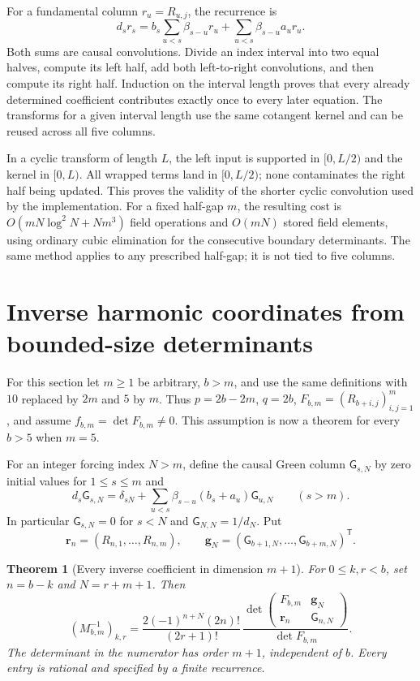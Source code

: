 \documentclass[11pt,a4paper]{article}
\newtheorem{theorem}{Theorem}[section]
\theoremstyle{definition}
\theoremstyle{remark}
\numberwithin{equation}{section}
\begin{document}
For a fundamental column $r_u=R_{u,j}$, the recurrence is
\[
 d_sr_s=b_s\sum_{u<s}\beta_{s-u}r_u
                  +\sum_{u<s}\beta_{s-u}a_ur_u.
\]
Both sums are causal convolutions. Divide an index interval into
two equal halves, compute its left half, add both left-to-right
convolutions, and then compute its right half. Induction on the
interval length proves that every already determined coefficient
contributes exactly once to every later equation. The transforms
for a given interval length use the same cotangent kernel and can
be reused across all five columns.

In a cyclic transform of length $L$, the left input is supported
in $[0,L/2)$ and the kernel in $[0,L)$. All wrapped terms land in
$[0,L/2)$; none contaminates the right half being updated.
This proves the validity of the shorter cyclic convolution used
by the implementation. For a fixed half-gap $m$, the resulting
cost is $O(mN\log^2N+Nm^3)$ field operations and $O(mN)$ stored
field elements, using ordinary cubic elimination for the consecutive
boundary determinants. The same method applies to any prescribed
half-gap; it is not tied to five columns.

\section{Inverse harmonic coordinates from bounded-size determinants}
\label{gt:green-section}

For this section let $m\ge1$ be arbitrary, $b>m$, and use the same
definitions with $10$ replaced by $2m$ and $5$ by $m$.
Thus $p=2b-2m$, $q=2b$, $F_{b,m}=(R_{b+i,j})_{i,j=1}^m$, and
assume $f_{b,m}=\det F_{b,m}\ne0$. This assumption is now a theorem
for every $b>5$ when $m=5$.

For an integer forcing index $N>m$, define the causal Green column
$\mathsf G_{s,N}$ by zero initial values for $1\le s\le m$ and
\begin{equation}\label{gt:Green}
 d_s\mathsf G_{s,N}
 =\delta_{sN}+\sum_{u<s}\beta_{s-u}(b_s+a_u)\mathsf G_{u,N}
                                  \qquad(s>m).
\end{equation}
In particular $\mathsf G_{s,N}=0$ for $s<N$ and
$\mathsf G_{N,N}=1/d_N$. Put
\[
 \mathbf r_n=(R_{n,1},\ldots,R_{n,m}),\qquad
 \mathbf g_N=(\mathsf G_{b+1,N},\ldots,
                         \mathsf G_{b+m,N})^{\mathsf T}.
\]

\begin{theorem}[Every inverse coefficient in dimension $m+1$]
\label{gt:inverse}
For $0\le k,r<b$, set $n=b-k$ and $N=r+m+1$. Then
\begin{equation}\label{gt:inverse-formula}
 \boxed{\displaystyle
 (M_{b,m}^{-1})_{k,r}
 =\frac{2(-1)^{n+N}(2n)!}{(2r+1)!}\,
 \frac{\det\begin{pmatrix}
       F_{b,m}&\mathbf g_N\\
       \mathbf r_n&\mathsf G_{n,N}
                  \end{pmatrix}}{\det F_{b,m}}.}
\end{equation}
The determinant in the numerator has order $m+1$, independent of
$b$. Every entry is rational and specified by a finite recurrence.
\end{theorem}
\end{document}
